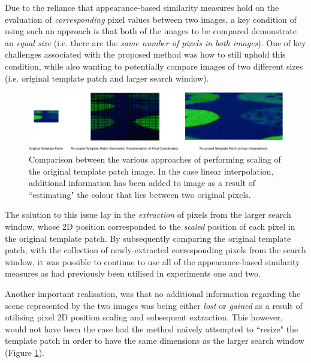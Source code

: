 Due to the reliance that appearance-based similarity measures hold on the evaluation of \textit{corresponding} pixel values between two images, a key condition of using such an approach is that both of the images to be compared demonstrate an \textit{equal size} (i.e. there are the \textit{same number of pixels in both images}). One of key challenges associated with the proposed method was how to still uphold this condition, while also wanting to potentially compare images of two different sizes (i.e. original template patch and larger search window). 

\vspace{10pt}

\begin{figure}[ht!]
\centering
\includegraphics[scale=0.4]{images/scaling_types_new}
  \caption{Comparison between the various approaches of performing scaling of the original template patch image. In the case linear interpolation, additional information has been added to image as a result of ``estimating" the colour that lies between two original pixels. }
\label{fig:scaletypes}
\end{figure} 

\vspace{10pt}

The solution to this issue lay in the \textit{extraction} of pixels from the larger search window, whose 2D position corresponded to the \textit{scaled} position of each pixel in the original template patch. By subsequently comparing the original template patch, with the collection of newly-extracted corresponding pixels from the search window, it was possible to continue to use all of the appearance-based similarity measures as had previously been utilised in experiments one and two. 

Another important realisation, was that no additional information regarding the scene represented by the two images was being either \textit{lost} or \textit{gained} as a result of utilising pixel 2D position scaling and subsequent extraction. This however, would not have been the case had the method naively attempted to ``resize" the template patch in order to have the same dimensions as the larger search window (Figure \ref{fig:scaletypes}). 

